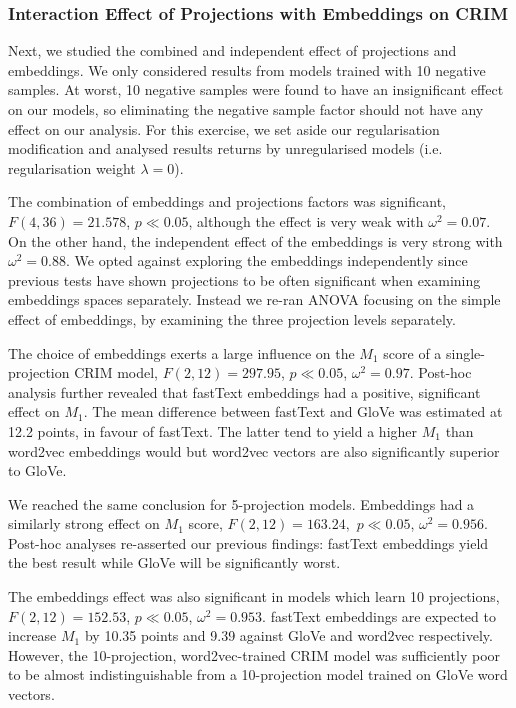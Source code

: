 \subsubsection{Interaction Effect of Projections with Embeddings on CRIM}\label{Eval_CRIM_ProjEmb}
Next, we studied the combined and independent effect of projections and embeddings.  We only considered results from models trained with 10 negative samples.  At worst, 10 negative samples were found to have an insignificant effect on our models, so eliminating the negative sample factor should not have any effect on our analysis.  For this exercise, we set aside our regularisation modification and analysed results returns by unregularised models (i.e. regularisation weight $\lambda=0$).

The combination of embeddings and projections factors was significant, $F(4,36)=21.578$, $p \ll 0.05$, although the effect is very weak with $\omega^2=0.07$.  On the other hand, the independent effect of the embeddings is very strong with $\omega^2 = 0.88$.  We opted against exploring the embeddings independently since previous tests have shown projections to be often significant when examining embeddings spaces separately.  Instead we re-ran \ac{ANOVA} focusing on the simple effect of embeddings, by examining the three  projection levels separately.

The choice of embeddings exerts a large influence on the $M_1$ score of a single-projection CRIM model, $F(2, 12)=297.95$, $p \ll 0.05$, $\omega^2 = 0.97$.  Post-hoc analysis further revealed that fastText embeddings had a positive, significant effect on $M_1$.  The mean difference between fastText and GloVe was estimated at 12.2 points, in favour of fastText.  The latter tend to yield a higher $M_1$ than word2vec embeddings would but word2vec vectors are also significantly superior to GloVe.

We reached the same conclusion for 5-projection models.  Embeddings had a similarly strong effect on $M_1$ score, $F(2, 12)=163.24,$ $p \ll 0.05$, $\omega^2 = 0.956$.  Post-hoc analyses re-asserted our previous findings: fastText embeddings yield the best result while GloVe will be significantly worst.

The embeddings effect was also significant in models which learn 10 projections, $F(2,12)=152.53$, $p \ll 0.05$, $\omega^2 = 0.953$.  fastText embeddings are expected to increase $M_1$ by 10.35 points and 9.39 against GloVe and word2vec respectively.  However, the 10-projection, word2vec-trained CRIM model was sufficiently poor to be almost indistinguishable from a 10-projection model trained on GloVe word vectors.

